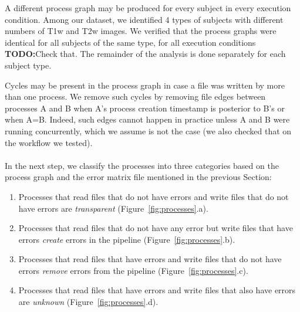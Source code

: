 \documentclass{article}
\newcommand{\todo}[1]{\color{red}\textbf{TODO:}#1\color{black}}
\begin{document}
A different process graph may be produced for every subject in every
execution condition. Among our dataset, we identified 4 types of
subjects with different numbers of T1w and T2w images. We verified
that the process graphs were identical for all subjects of the same
type, for all execution conditions \todo{Check that}. The remainder of
the analysis is done separately for each subject type.

Cycles may be present in the process graph in case a file was written 
by more than one process. We remove such cycles by removing file edges 
between processes A and B when A's process creation timestamp is 
posterior to B's or when A=B. Indeed, such edges cannot happen in 
practice unless A and B were running concurrently, which we assume is 
not the case (we also checked that on the workflow we tested). 

\paragraph{} In the next step, we classify the processes into three 
categories based on the process graph and the error matrix file 
mentioned in the previous Section:
\begin{enumerate}
\item Processes that read files that do not have errors and write files that do not 
have errors are \emph{transparent} (Figure~\ref{fig:processes}.a).
\item Processes that read files 
that do not have any error but write files that have errors 
\emph{create} errors in the pipeline (Figure~\ref{fig:processes}.b).
\item Processes that read files 
that have errors and write files that do not have errors \emph{remove} 
errors from the pipeline (Figure~\ref{fig:processes}.c).
\item Processes that read files that have errors and write files that also have errors are 
\emph{unknown} (Figure~\ref{fig:processes}.d).
\end{enumerate}
\end{document}
